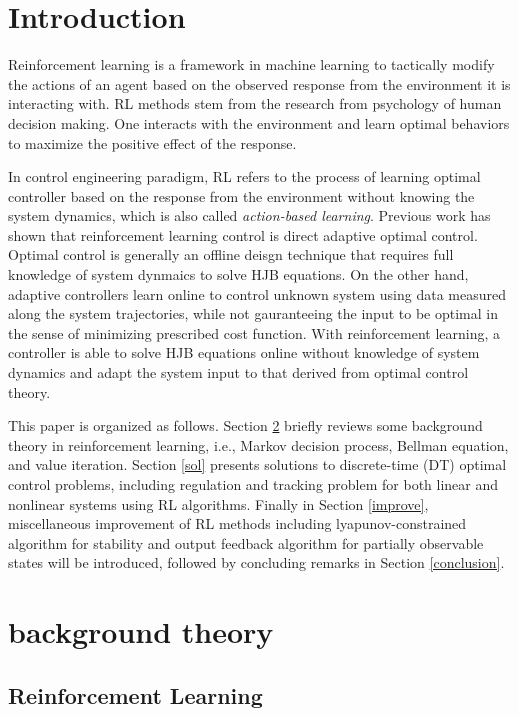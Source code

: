 \documentclass[conference]{IEEEtran}
\begin{document}
\section{Introduction}
Reinforcement learning is a framework in machine learning to tactically modify the actions of an agent based on the observed response from the environment it is interacting with. RL methods stem from the research from psychology of human decision making. One interacts with the environment and learn optimal behaviors to maximize the positive effect of the response.
\par In control engineering paradigm, RL refers to the process of learning optimal controller based on the response from the environment without knowing the system dynamics, which is also called \textit{action-based learning}. Previous work \cite{b1} has shown that reinforcement learning control is direct adaptive optimal control. Optimal control is generally an offline deisgn technique that requires full knowledge of system dynmaics to solve HJB equations. On the other hand, adaptive controllers learn online to control unknown system using data measured along the system trajectories, while not gauranteeing the input to be optimal in the sense of minimizing prescribed cost function. With reinforcement learning, a controller is able to solve HJB equations online without knowledge of system dynamics and adapt the system input to that derived from optimal control theory.
\par This paper is organized as follows. Section \ref{background} briefly reviews some background theory in reinforcement learning, i.e., Markov decision process, Bellman equation, and value iteration. Section \ref{sol} presents solutions to discrete-time (DT) optimal control problems, including regulation and tracking problem for both linear and nonlinear systems using RL algorithms. Finally in Section \ref{improve}, miscellaneous improvement of RL methods including lyapunov-constrained algorithm for stability and output feedback algorithm for partially observable states will be introduced, followed by concluding remarks in Section \ref{conclusion}. 
\section{background theory} \label{background}

\subsection{Reinforcement Learning}
\end{document}

